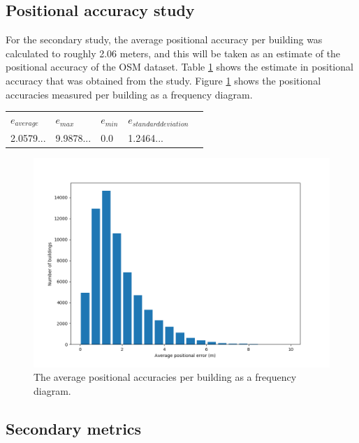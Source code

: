 \documentclass{kththesis}
\begin{document}
\subsection{Positional accuracy study}

For the secondary study, the average positional accuracy per building was calculated to roughly 2.06 meters, and this will be taken as an estimate of the positional accuracy of the OSM dataset.
Table \ref{table:positional-accuracy} shows the estimate in positional accuracy that was obtained from the study.
Figure \ref{fig:bar-plot-positional-accuracy} shows the positional accuracies measured per building as a frequency diagram.

\begin{table}[H]
    \begin{tabular}{lllll}
        $e_{average}$ & $e_{max}$ & $e_{min}$ & $e_{standard deviation}$ \\
        2.0579... & 9.9878... & 0.0 & 1.2464...
    \end{tabular}
    \label{table:positional-accuracy}
\end{table}

\begin{figure}[H]
    \centering
    \includegraphics[width=\textwidth,height=0.5\textheight,keepaspectratio]{img_pos_error_plot}
    \caption{The average positional accuracies per building as a frequency diagram.}
    \label{fig:bar-plot-positional-accuracy}
\end{figure}

\subsection{Secondary metrics}
\end{document}
